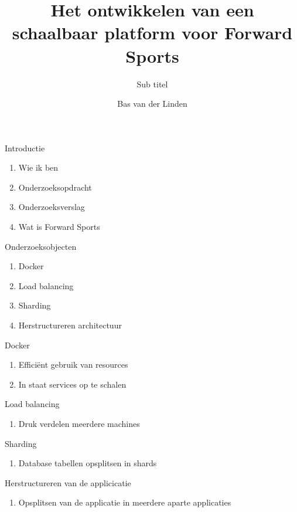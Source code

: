 \documentclass{beamer}
\title[Ontwikkelen van een schaalbaar platform]{Het ontwikkelen van een schaalbaar platform voor Forward Sports}
\subtitle{Sub titel}
\author{Bas van der Linden}
\institute{Hogeschool van Amsterdam}
\date{}
\begin{document}
\begin{frame}
\titlepage
\end{frame}

\begin{frame}{Introductie}
\begin{enumerate}
\item Wie ik ben
\item Onderzoeksopdracht
\item Onderzoeksverslag
\item Wat is Forward Sports
\end{enumerate}
\end{frame}

\begin{frame}{Onderzoeksobjecten}
\begin{enumerate}
\item Docker
\item Load balancing
\item Sharding
\item Herstructureren architectuur
\end{enumerate}
\end{frame}

\begin{frame}{Docker}
\begin{enumerate}
\item Efficiënt gebruik van resources
\item In staat services op te schalen
\end{enumerate}
\end{frame}

\begin{frame}{Load balancing}
\begin{enumerate}
\item Druk verdelen meerdere machines
\end{enumerate}
\end{frame}

\begin{frame}{Sharding}
\begin{enumerate}
\item Database tabellen opsplitsen in shards
\end{enumerate}
\end{frame}

\begin{frame}{Herstructureren van de applicicatie}
\begin{enumerate}
\item Opsplitsen van de applicatie
      in meerdere aparte applicaties
\end{enumerate}
\end{frame}
\end{document}
